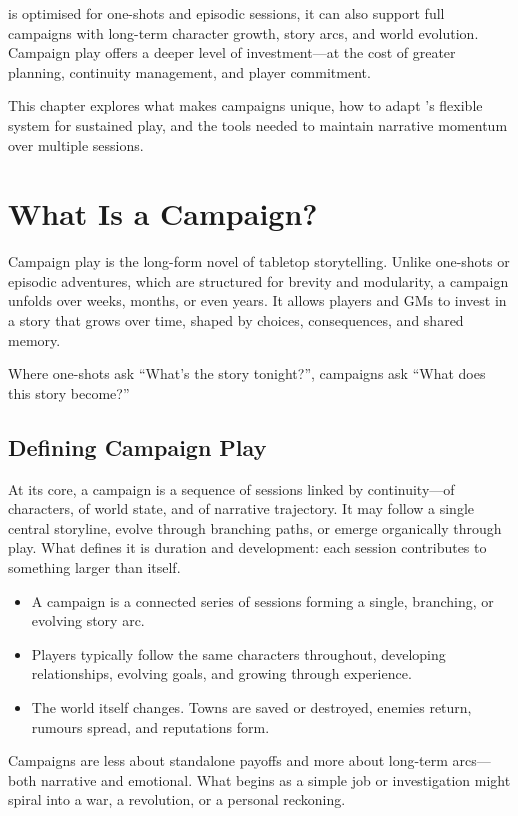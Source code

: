 
 \wyrd is optimised for one-shots and episodic sessions, it can also support full campaigns with long-term character growth, story arcs, and world evolution. Campaign play offers a deeper level of investment—at the cost of greater planning, continuity management, and player commitment.

This chapter explores what makes campaigns unique, how to adapt \wyrd’s flexible system for sustained play, and the tools needed to maintain narrative momentum over multiple sessions.

\section{What Is a Campaign?}

Campaign play is the long-form novel of tabletop storytelling. Unlike one-shots or episodic adventures, which are structured for brevity and modularity, a campaign unfolds over weeks, months, or even years. It allows players and GMs to invest in a story that grows over time, shaped by choices, consequences, and shared memory.

Where one-shots ask “What’s the story tonight?”, campaigns ask “What does this story become?”

\subsection*{Defining Campaign Play}

At its core, a campaign is a sequence of sessions linked by continuity—of characters, of world state, and of narrative trajectory. It may follow a single central storyline, evolve through branching paths, or emerge organically through play. What defines it is duration and development: each session contributes to something larger than itself.

\begin{itemize}
    \item A campaign is a connected series of sessions forming a single, branching, or evolving story arc.
    \item Players typically follow the same characters throughout, developing relationships, evolving goals, and growing through experience.
    \item The world itself changes. Towns are saved or destroyed, enemies return, rumours spread, and reputations form.
\end{itemize}

Campaigns are less about standalone payoffs and more about long-term arcs—both narrative and emotional. What begins as a simple job or investigation might spiral into a war, a revolution, or a personal reckoning.

